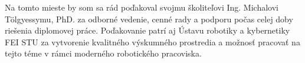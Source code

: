 Na tomto mieste by som sa rád poďakoval svojmu školiteľovi Ing. Michalovi Tölgyessymu, PhD. za odborné vedenie, cenné rady a podporu počas celej doby riešenia diplomovej práce. 
Poďakovanie patrí aj Ústavu robotiky a kybernetiky FEI STU za vytvorenie kvalitného výskumného prostredia a možnosť pracovať na tejto téme v rámci moderného robotického pracoviska.
